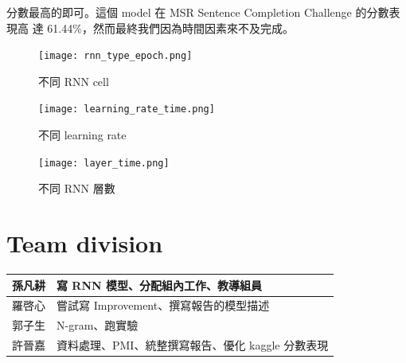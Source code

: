\documentclass[12pt, a4paper]{article}
\theoremstyle{mystyle}	%
\begin{document}
\begin{enumerate}
    分數最高的即可。這個 model 在 MSR Sentence Completion Challenge 的分數表現高
    達 61.44\%，然而最終我們因為時間因素來不及完成。
    \begin{figure}[!htb]
      \centering
      \texttt{[image: rnn\_type\_epoch.png]}
      \caption{不同 RNN cell}
      \label{fig:rnnType}
     \endminipage\hfill
      \texttt{[image: learning\_rate\_time.png]}
      \caption{不同 learning rate}
      \label{fig:learningRate}
     \endminipage\hfill
      \texttt{[image: layer\_time.png]}
      \caption{不同 RNN 層數}
      \label{fig:layerTime}
     \endminipage
    \end{figure}
\end{enumerate}

\section{Team division}
\begin{table}[h]
\centering
\begin{tabular}{ |C{2cm}|C{10cm}| }
  \hline
  孫凡耕 & 寫 RNN 模型、分配組內工作、教導組員\\
  \hline
  羅啓心 & 嘗試寫 Improvement、撰寫報告的模型描述\\
  \hline
  郭子生 & N-gram、跑實驗\\
  \hline
  許晉嘉 & 資料處理、PMI、統整撰寫報告、優化 kaggle 分數表現\\
  \hline
\end{tabular}
\end{table}
\end{document}
